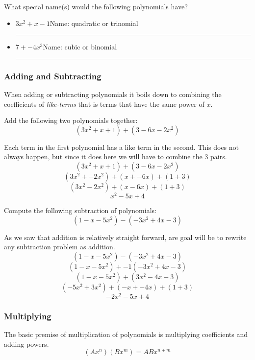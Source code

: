 \begin{exercise}
What special name(s) would the following polynomials have?
\begin{itemize}
    \item $3x^2+x-1$\quad Name: \ifprintanswers quadratic or trinomial \else \rule{60pt}{0.5pt}\fi
    \item $7+-4x^3$\quad Name: \ifprintanswers cubic or binomial \else \rule{60pt}{0.5pt}\fi
\end{itemize}
\end{exercise}

\newpage

\subsubsection{Adding and Subtracting}
When adding or subtracting polynomials it boils down to combining the coefficients of \emph{like-terms}
that is terms that have the same power of $x$.
\begin{exercise}
Add the following two polynomials together:
\[
(3x^2+x+1)+(3-6x-2x^2)
\]
\end{exercise}
\begin{solution}[1.5in]
Each term in the first polynomial has a like term in the second. This does not
always happen, but since it does here we will have to combine the 3 pairs.
\[
(3x^2+x+1)+(3-6x-2x^2)
\]
\[
(3x^2+-2x^2)+(x+-6x)+(1+3)
\]
\[
(3x^2-2x^2)+(x-6x)+(1+3)
\]
\[
x^2-5x+4
\]
\end{solution}
\vspace{0.5em}

\begin{exercise}
Compute the following subtraction of polynomials:
\[
(1-x-5x^2)-(-3x^2+4x-3)
\]
\end{exercise}
\begin{solution}[1.5in]
As we saw that addition is relatively straight forward, are goal will be to
rewrite any subtraction problem as addition.
\[
(1-x-5x^2)-(-3x^2+4x-3)
\]
\[
(1-x-5x^2)+-1(-3x^2+4x-3)
\]
\[
(1-x-5x^2)+(3x^2-4x+3)
\]
\[
(-5x^2+3x^2)+(-x+-4x)+(1+3)
\]
\[
-2x^2-5x+4
\]
\end{solution}
\vspace{0.5em}

\subsubsection{Multiplying}

The basic premise of multiplication of polynomials is multiplying coefficients and
adding powers.
\[
(Ax^n)(Bx^m)=ABx^{n+m}
\]

